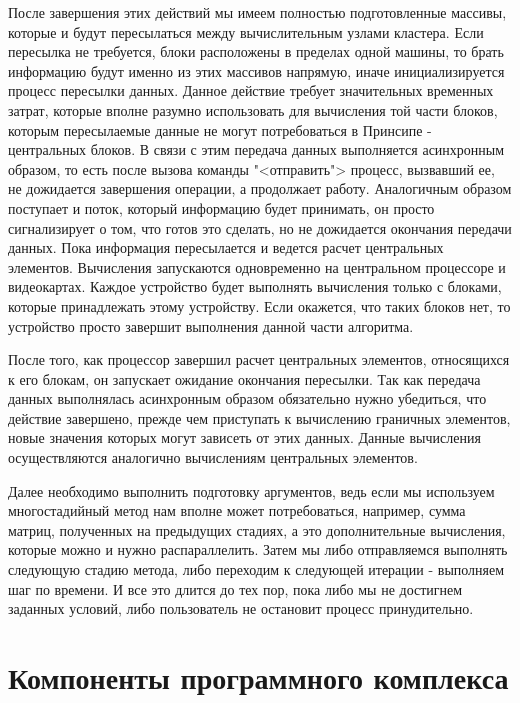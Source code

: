 \documentclass[a4paper, 14pt]{extarticle}
\theoremstyle{definition}
\begin{document}
\par После завершения этих действий мы имеем полностью подготовленные массивы, которые и будут пересылаться между вычислительным узлами кластера. Если пересылка не требуется, блоки расположены в пределах одной машины, то брать информацию будут именно из этих массивов напрямую, иначе инициализируется процесс пересылки данных. Данное действие требует значительных временных затрат, которые вполне разумно использовать для вычисления той части блоков, которым пересылаемые данные не могут потребоваться в Принсипе - центральных блоков. В связи с этим передача данных выполняется асинхронным образом, то есть после вызова команды "<отправить"> процесс, вызвавший ее, не дожидается завершения операции, а продолжает работу. Аналогичным образом поступает и поток, который информацию будет принимать, он просто сигнализирует о том, что готов это сделать, но не дожидается окончания передачи данных. Пока информация пересылается и ведется расчет центральных элементов. Вычисления запускаются одновременно на центральном процессоре и видеокартах. Каждое устройство будет выполнять вычисления только с блоками, которые принадлежать этому устройству. Если окажется, что таких блоков нет, то устройство просто завершит выполнения данной части алгоритма.

\par После того, как процессор завершил расчет центральных элементов, относящихся к его блокам, он запускает ожидание окончания пересылки. Так как передача данных выполнялась асинхронным образом обязательно нужно убедиться, что действие завершено, прежде чем приступать к вычислению граничных элементов, новые значения которых могут зависеть от этих данных. Данные вычисления осуществляются аналогично вычислениям центральных элементов.

\par Далее необходимо выполнить подготовку аргументов, ведь если мы используем многостадийный метод нам вполне может потребоваться, например, сумма матриц, полученных на предыдущих стадиях, а это дополнительные вычисления, которые можно и нужно распараллелить. Затем мы либо отправляемся выполнять следующую стадию метода, либо переходим к следующей итерации - выполняем шаг по времени. И все это длится до тех пор, пока либо мы не достигнем заданных условий, либо пользователь не остановит процесс принудительно.

\section{Компоненты программного комплекса}
\end{document}
